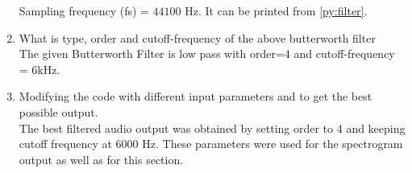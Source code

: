 \documentclass[journal,12pt,twocolumn]{IEEEtran}
\theoremstyle{remark}
\renewcommand\thesection{\arabic{section}}
\numberwithin{equation}{subsection}
\begin{document}
\begin{enumerate}[label=\thesection.\arabic*]
\solution
Sampling frequency (fs) = $44100$ Hz. It can be printed from \ref{py:filter}.
\\
\item
What is type, order and  cutoff-frequency of the above butterworth filter
\\
\solution
The given Butterworth Filter is low pass with order=4 and cutoff-frequency = 6kHz.
\\
\item
Modifying the code with different input parameters and to get the best possible output.
\\
\solution The best filtered audio output was obtained by setting order to 4 and keeping cutoff frequency at 6000 Hz. These parameters were used for the spectrogram output as well as for this section.
\end{enumerate}
\end{document}
